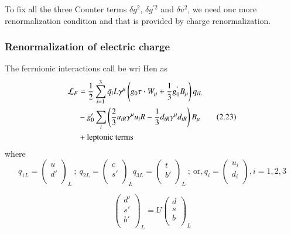 To fix all the three Counter terms $\delta g^{2}$, $\delta g^{' 2}$ and $\delta v^{2}$, we need onc more renormalization condition and that is provided by charge renormalization.

\subsubsection*{Renormalization of electric charge}

The ferrnionic interactions call be wri Hen as 
\begin{align}
\mathcal{L}_{F} &= \frac{1}{2} \sum_{i =1}^{3}\bar{q_{i}}L \gamma^{\mu} \left(g_{0} \tau \cdot W_{\mu}+ \frac{1}{3} g^{'}_{0}B_{\mu} \right)q_{iL}\notag\\
& - g'_{0}\sum_{i}\left(\frac{2}{3}u_{i R} \gamma^{\mu}u_{i} R - \frac{1}{3}d_{i R} \gamma^{\mu}d_{i R}\right)B_{\mu}\tag{2.23}\\
&+ \text{leptonic terms}\notag
\end{align}
where
\begin{equation*}
q_{1 L} =
\begin{pmatrix}
u \\
d'\\
\end{pmatrix}_{L}
~;~
q_{2 L} =
\begin{pmatrix}
c \\
s'\\
\end{pmatrix}_{L}
q_{3 L} =
\begin{pmatrix}
t \\
b'\\
\end{pmatrix}_{L}
~;~
\text{or}, q_{i} =
\begin{pmatrix}
u_{i} \\
d_{i}\\
\end{pmatrix}
, 
i = 1,2,3
\end{equation*}

\begin{equation*}
\begin{pmatrix}
d' \\
s'\\
b'\\
\end{pmatrix}_{L}
=U 
\begin{pmatrix}
d \\
s\\
b\\
\end{pmatrix}_{L}
\end{equation*}

